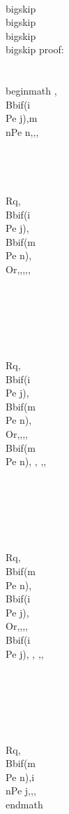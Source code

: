 \\bigskip
\\bigskip
\\bigskip
\\bigskip
proof:\\\\
\\begin{math} 
, \\Bb{if(i \\Pe j)}{,m \\nPe n,}{,},\\\\\\\\
\\Rq, \\Bb{if(i \\Pe j)}{,\\Bb{if(m \\Pe n)}{, \\Or,}{,},}{,}, \\\\\\\\\\\\
\\Rq, \\Bb{if(i \\Pe j)}{,\\Bb{if(m \\Pe n)}{, \\Or,}{,},}{,\\Bb{if(m \\Pe n)}{, }{, },}, \\\\\\\\\\\\
\\Rq, \\Bb{if(m \\Pe n)}{,\\Bb{if(i \\Pe j)}{, \\Or,}{,},}{,\\Bb{if(i \\Pe j)}{, }{, },}, \\\\\\\\\\\\
\\Rq,  \\Bb{if(m \\Pe n)}{,i \\nPe j,}{,},
\\end{math}



